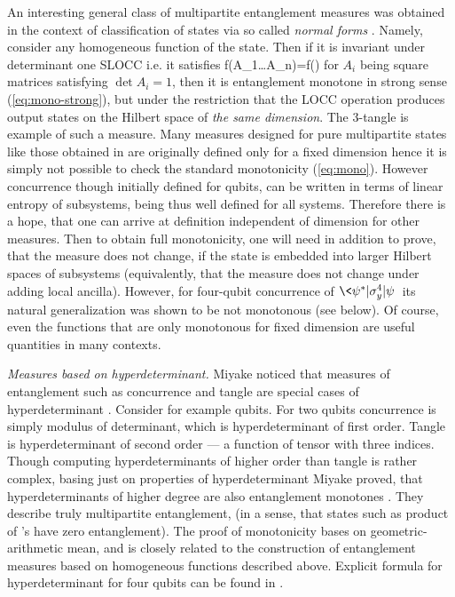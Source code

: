 \documentclass[rmp,12pt,preprint]{revtex4-2}
\begin{document}
An interesting general class of multipartite entanglement measures was
obtained in the context of classification of states via
so called {\it normal forms} \cite{VerstraeteDM2001-normal}.
Namely, consider any homogeneous function of the state. Then if it is
invariant under determinant one SLOCC i.e. it satisfies
\be
f(A_1\ot \ldots A_n\psi)=f(\psi)
\ee
for $A_i$ being square matrices satisfying $\det A_i=1$,
then it is entanglement monotone in strong sense
(\ref{eq:mono-strong}), but under the restriction that the LOCC operation
produces output states on the Hilbert space of {\it the same dimension}.
The 3-tangle is example of such a measure.
Many measures designed for pure multipartite states like those
obtained in \cite{OsterlohS2005-filters,Miyake2002-hyper,
WongC2000-multi,Akhtarshenas2003-multiconc} are originally defined only for
a fixed dimension hence it is simply not possible to check the
standard monotonicity (\ref{eq:mono}).
However concurrence  though initially defined for qubits, can be  written in
terms of linear entropy of subsystems, being thus well defined for
all systems. Therefore there is a hope, that one can arrive at definition
independent of dimension for other measures. Then to obtain full
monotonicity, one will need in addition to prove, that  the measure
does not change, if the state is embedded into larger Hilbert spaces
of subsystems (equivalently, that the measure does not change under
adding local ancilla). However, for four-qubit concurrence of
\cite{WongC2000-multi} $\<\psi^*|\sigma_y^4|\psi\>$
its  natural generalization was shown to be not monotonous \cite{DemkowiczBKM2006-multi} (see below).
Of course, even the functions that are only  monotonous for
fixed dimension are useful quantities in many contexts.




{\it Measures based on hyperdeterminant.} Miyake noticed that
measures of entanglement such as concurrence and tangle are special
cases of hyperdeterminant \cite{Miyake2002-hyper}. Consider for
example qubits. For two qubits concurrence is simply modulus of
determinant, which is hyperdeterminant of first order. Tangle is
hyperdeterminant of second order --- a function of tensor with three
indices. Though computing hyperdeterminants of higher order than
tangle is rather complex, basing just on properties of
hyperdeterminant Miyake proved, that hyperdeterminants of higher
degree are also entanglement monotones \cite{Miyake2004-slocc}. They
describe truly multipartite entanglement, (in a sense, that states
such as product of \epr's have zero entanglement). The proof of
monotonicity bases on geometric-arithmetic mean, and is closely
related to the construction of entanglement measures based on
homogeneous functions  described above. Explicit formula
for hyperdeterminant for four qubits can be found in
\cite{Levay2006-4qubits}.
\end{document}
